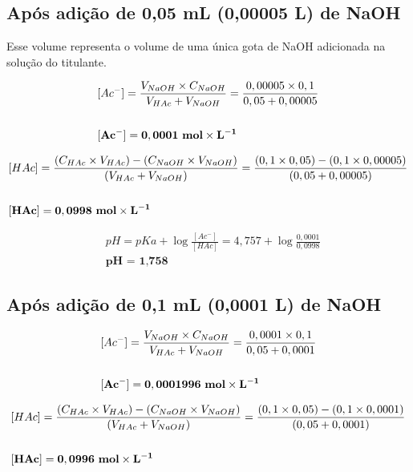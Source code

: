 \documentclass[a4paper, 12pt]{report}
\begin{document}
\subsection{Após adição de 0,05 mL (0,00005 L) de NaOH}
Esse volume representa o volume de uma única gota de NaOH adicionada na solução do titulante.

\begin{fleqn}
\begin{align*}
	& [Ac^{-}] = \frac{ V_{NaOH} \times C_{NaOH} }{ V_{HAc} + V_{NaOH} } = \frac{0,00005 \times 0,1}{0,05 + 0,00005} \\ \\
	& \mathbf{[Ac^{-}] = 0,0001 \text{ \textbf{mol}} \times L^{-1}}
\end{align*}
\end{fleqn}

\begin{fleqn}
\begin{align*}
	& [HAc] = \frac{ (C_{HAc} \times V_{HAc}) - (C_{NaOH} \times V_{NaOH}) }{ (V_{HAc} + V_{NaOH}) } = \frac{ (0,1 \times 0,05) - (0,1 \times 0,00005) }{ (0,05 + 0,00005) }\\ \\
	& \mathbf{[HAc] = 0,0998 \text{ \textbf{mol}} \times L^{-1}}
\end{align*}
\end{fleqn}

\begin{fleqn}
\begin{align*}
 	& pH = pKa + \log \frac{[Ac^{-}]}{[HAc]} = 4,757 + \log \frac{0,0001}{0,0998} \\
	& \textbf{pH = 1,758}
\end{align*}
\end{fleqn}

\subsection{Após adição de 0,1 mL (0,0001 L) de NaOH}
\begin{fleqn}
	\begin{align*}
		& [Ac^{-}] = \frac{ V_{NaOH} \times C_{NaOH} }{ V_{HAc} + V_{NaOH} } = \frac{0,0001 \times 0,1}{0,05 + 0,0001} \\ \\
		& \mathbf{[Ac^{-}] = 0,0001996 \text{ \textbf{mol}} \times L^{-1}}
	\end{align*}
\end{fleqn}

\begin{fleqn}
	\begin{align*}
		& [HAc] = \frac{ (C_{HAc} \times V_{HAc}) - (C_{NaOH} \times V_{NaOH}) }{ (V_{HAc} + V_{NaOH}) } = \frac{ (0,1 \times 0,05) - (0,1 \times 0,0001) }{ (0,05 + 0,0001) }\\ \\
		& \mathbf{[HAc] = 0,0996 \text{ \textbf{mol}} \times L^{-1}}
	\end{align*}
\end{fleqn}
\end{document}
